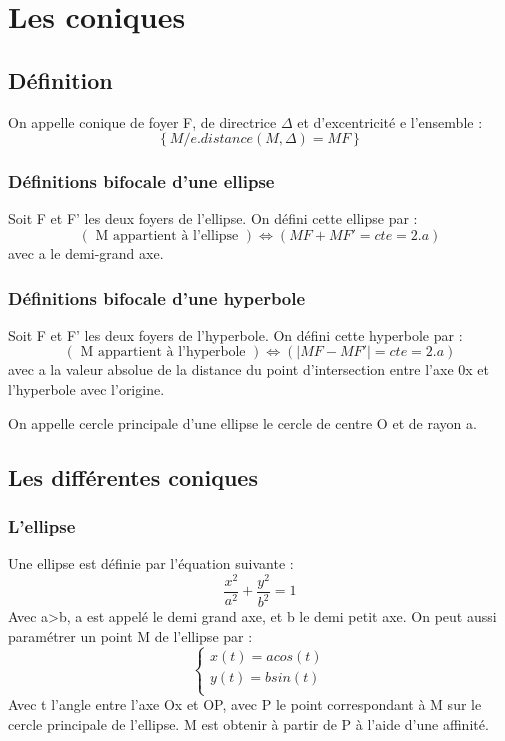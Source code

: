 \chapter{Les coniques}
\section{Définition}
\begin{de}
 On appelle conique de foyer F, de directrice $\Delta$ et d'excentricité e l'ensemble :
$$\left\lbrace M / e.distance(M,\Delta) = MF \right\rbrace $$
\end{de}
\subsection{Définitions bifocale d'une ellipse}
\begin{de}
Soit F et F' les deux foyers de l'ellipse. On défini cette ellipse par : 
$$(\mbox{ M appartient à l'ellipse }) \Leftrightarrow ( MF + MF' = cte = 2.a)$$
avec a le demi-grand axe.
\end{de}
\subsection{Définitions bifocale d'une hyperbole}
\begin{de}
Soit F et F' les deux foyers de l'hyperbole. On défini cette hyperbole par : 
$$(\mbox{ M appartient à l'hyperbole }) \Leftrightarrow ( |MF - MF'| = cte = 2.a)$$
avec a la valeur absolue de la distance du point d'intersection entre l'axe 0x et l'hyperbole avec l'origine.
\end{de}
\begin{de}
On appelle cercle principale d'une ellipse le cercle de centre O et de rayon a.
\end{de}
\section{Les différentes coniques}
\subsection{L'ellipse}
Une ellipse est définie par l'équation suivante : 
$$\dfrac{x^2}{a^2} + \dfrac{y^2}{b^2} = 1$$
Avec a>b, a est appelé le demi grand axe, et b le demi petit axe. On peut aussi paramétrer un point M de l'ellipse par : 
 \[\left\{\begin{array}{l}
   x(t) = acos(t)\\
   y(t) = bsin(t) \\
  \end{array}\right.\] 
Avec t l'angle entre l'axe Ox et OP, avec P le point correspondant à M sur le cercle principale de l'ellipse. M est obtenir à partir de P à l'aide d'une affinité.
